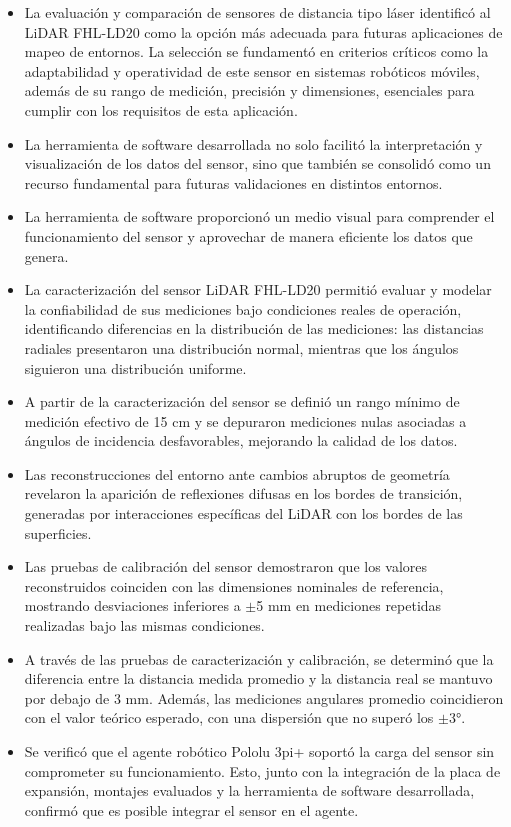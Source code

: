\begin{itemize}
	\item La evaluación y comparación de sensores de distancia tipo láser identificó al LiDAR FHL-LD20 como la opción más adecuada para futuras aplicaciones de mapeo de entornos. La selección se fundamentó en criterios críticos como la adaptabilidad y operatividad de este sensor en sistemas robóticos móviles, además de su rango de medición, precisión y dimensiones, esenciales para cumplir con los requisitos de esta aplicación.
	\item La herramienta de software desarrollada no solo facilitó la interpretación y visualización de los datos del sensor, sino que también se consolidó como un recurso fundamental para futuras validaciones en distintos entornos. 
	\item La herramienta de software proporcionó un medio visual para comprender el funcionamiento del sensor y aprovechar de manera eficiente los datos que genera.
	\item La caracterización del sensor LiDAR FHL-LD20 permitió evaluar y modelar la confiabilidad de sus mediciones bajo condiciones reales de operación, identificando diferencias en la distribución de las mediciones: las distancias radiales presentaron una distribución normal, mientras que los ángulos siguieron una distribución uniforme.
	\item A partir de la caracterización del sensor se definió un rango mínimo de medición efectivo de 15 cm y se depuraron mediciones nulas asociadas a ángulos de incidencia desfavorables, mejorando la calidad de los datos.
	\item Las reconstrucciones del entorno ante cambios abruptos de geometría revelaron la aparición de reflexiones difusas en los bordes de transición, generadas por interacciones específicas del LiDAR con los bordes de las superficies.
	\item Las pruebas de calibración del sensor demostraron que los valores reconstruidos coinciden con las dimensiones nominales de referencia, mostrando desviaciones inferiores a $\pm$5 mm en mediciones repetidas realizadas bajo las mismas condiciones.
	\item A través de las pruebas de caracterización y calibración, se determinó que la diferencia entre la distancia medida promedio y la distancia real se mantuvo por debajo de 3 mm. Además, las mediciones angulares promedio coincidieron con el valor teórico esperado, con una dispersión que no superó los $\pm$3°.
	\item Se verificó que el agente robótico Pololu 3pi+ soportó la carga del sensor sin comprometer su funcionamiento. Esto, junto con la integración de la placa de expansión, montajes evaluados y la herramienta de software desarrollada, confirmó que es posible integrar el sensor en el agente.
\end{itemize}

